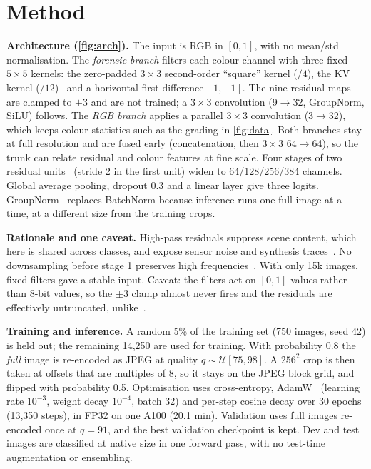 \documentclass[10pt,twocolumn,letterpaper]{article}
\renewcommand{\paragraph}[1]{\vspace{0.2em}\noindent\textbf{#1.}}
\begin{document}
\section{Method}
\label{sec:method}
\paragraph{Architecture (\cref{fig:arch})}
The input is RGB in $[0,1]$, with no mean/std normalisation. The \emph{forensic branch} filters each colour channel with three fixed $5{\times}5$ kernels: the zero-padded $3{\times}3$ second-order ``square'' kernel ($/4$), the KV kernel ($/12$)~\cite{fridrich2012rich} and a horizontal first difference $[1,-1]$. The nine residual maps are clamped to $\pm3$ and are not trained; a $3{\times}3$ convolution (9$\to$32, GroupNorm, SiLU) follows. The \emph{RGB branch} applies a parallel $3{\times}3$ convolution (3$\to$32), which keeps colour statistics such as the grading in \cref{fig:data}. Both branches stay at full resolution and are fused early (concatenation, then $3{\times}3$ 64$\to$64), so the trunk can relate residual and colour features at fine scale. Four stages of two residual units~\cite{he2016deep} (stride 2 in the first unit) widen to 64/128/256/384 channels. Global average pooling, dropout 0.3 and a linear layer give three logits. GroupNorm~\cite{wu2018group} replaces BatchNorm because inference runs one full image at a time, at a different size from the training crops.

\paragraph{Rationale and one caveat}
High-pass residuals suppress scene content, which here is shared across classes, and expose sensor noise and synthesis traces~\cite{fridrich2012rich,zhou2018learning}. No downsampling before stage 1 preserves high frequencies~\cite{frank2020leveraging}. With only 15k images, fixed filters gave a stable input. Caveat: the filters act on $[0,1]$ values rather than 8-bit values, so the $\pm3$ clamp almost never fires and the residuals are effectively untruncated, unlike~\cite{fridrich2012rich}.

\paragraph{Training and inference}
A random 5\% of the training set (750 images, seed 42) is held out; the remaining 14,250 are used for training. With probability 0.8 the \emph{full} image is re-encoded as JPEG at quality $q\sim\mathcal{U}[75,98]$. A $256^2$ crop is then taken at offsets that are multiples of 8, so it stays on the JPEG block grid, and flipped with probability 0.5. Optimisation uses cross-entropy, AdamW~\cite{loshchilov2019decoupled} (learning rate $10^{-3}$, weight decay $10^{-4}$, batch 32) and per-step cosine decay over 30 epochs (13,350 steps), in FP32 on one A100 (20.1 min). Validation uses full images re-encoded once at $q{=}91$, and the best validation checkpoint is kept. Dev and test images are classified at native size in one forward pass, with no test-time augmentation or ensembling.
\end{document}
